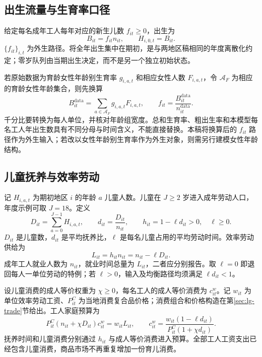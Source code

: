 \documentclass[UTF8,a4paper,zihao=-4,fontset=windows]{ctexart}
\numberwithin{equation}{section}
\newcommand{\pc}{P^{C}}
\begin{document}
\subsection{出生流量与生育率口径}
给定每名成年工人每年对应的新生儿数 $f_{it}\geq0$，出生为
\begin{equation}
 B_{it}=f_{it}n_{it},\qquad H_{i,0,t}=B_{it}.
 \label{eq:lg-birth}
\end{equation}
$\{f_{it}\}_{i,t}$ 为外生路径。将全年出生集中在期初，是与两地区稿相同的年度离散化约定；零岁队列由当期出生决定，而不是另一个独立初始状态。

若原始数据为育龄女性年龄别生育率 $g_{i,a,t}$ 和相应女性人数 $F_{i,a,t}$，令 $\mathcal A_F$ 为相应的育龄女性年龄集合，则先换算
\begin{equation}
 B^{\mathrm{data}}_{it}=\sum_{a\in\mathcal A_F}g_{i,a,t}F_{i,a,t},\qquad
 f_{it}=\frac{B^{\mathrm{data}}_{it}}{n^{\mathrm{data}}_{it}}.
 \label{eq:lg-fertility-data}
\end{equation}
千分比要转换为每人单位，并核对年龄组宽度。总和生育率、粗出生率和本模型每名工人年出生数具有不同分母与时间含义，不能直接替换。本稿将换算后的 $f_{it}$ 路径作为外生输入；若改以女性年龄别生育率作为外生对象，则需另行建模女性年龄结构。

\subsection{儿童抚养与效率劳动}
记 $H_{i,a,t}$ 为期初地区 $i$ 的年龄 $a$ 儿童人数。儿童在 $J\geq2$ 岁进入成年劳动人口，年度示例可取 $J=18$。定义
\begin{equation}
 D_{it}=\sum_{a=0}^{J-1}H_{i,a,t},\qquad
 d_{it}=\frac{D_{it}}{n_{it}},\qquad
 h_{it}=1-\ell d_{it}>0,\quad \ell\geq0.
 \label{eq:lg-dependency}
\end{equation}
$D_{it}$ 是儿童数，$d_{it}$ 是平均抚养比，$\ell$ 是每名儿童占用的平均劳动时间。效率劳动供给为
\begin{equation}
 L_{it}=h_{it}n_{it}=n_{it}-\ell D_{it}.
 \label{eq:lg-labor-supply}
\end{equation}
成年工人就业人数为 $n_{it}$，就业时间总量为 $L_{it}$，二者应分别报告。取 $\ell=0$ 即退回每人一单位劳动的特例；若 $\ell>0$，输入及均衡路径均须满足 $\ell d_{it}<1$。

设儿童消费的成人等价权重为 $\chi\geq0$，每名工人的成人等价消费为 $c^w_{it}$。记 $w_{it}$ 为单位效率劳动工资、$\pc_{it}$ 为当地消费复合品价格；消费组合和价格构造在第\ref{sec:lg-trade}节给出。工人家庭预算为
\begin{equation}
 \pc_{it}(n_{it}+\chi D_{it})c^w_{it}=w_{it}L_{it},\qquad
 c^w_{it}=\frac{w_{it}(1-\ell d_{it})}
 {\pc_{it}(1+\chi d_{it})}.
 \label{eq:lg-worker-budget}
\end{equation}
抚养时间和儿童消费分别通过 $h_{it}$ 与成人等价消费进入预算。全部工人工资支出已经包含儿童消费，商品市场不再重复增加一份育儿消费。
\end{document}
